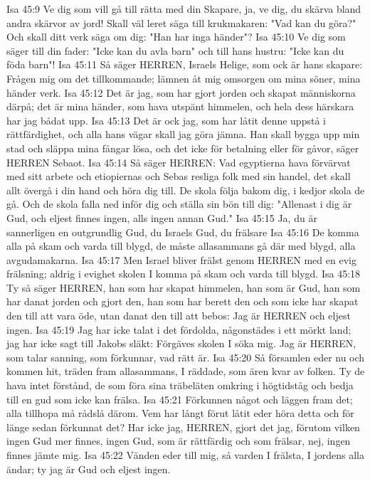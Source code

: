 Isa 45:9  Ve dig som vill gå till rätta med din Skapare, ja, ve dig, du skärva bland andra skärvor av jord! Skall väl leret säga till krukmakaren: "Vad kan du göra?" Och skall ditt verk säga om dig: "Han har inga händer"?
Isa 45:10  Ve dig som säger till din fader: "Icke kan du avla barn" och till hans hustru: "Icke kan du föda barn"!
Isa 45:11  Så säger HERREN, Israels Helige, som ock är hans skapare: Frågen mig om det tillkommande; lämnen åt mig omsorgen om mina söner, mina händer verk.
Isa 45:12  Det är jag, som har gjort jorden och skapat människorna därpå; det är mina händer, som hava utspänt himmelen, och hela dess härskara har jag bådat upp.
Isa 45:13  Det är ock jag, som har låtit denne uppstå i rättfärdighet, och alla hans vägar skall jag göra jämna. Han skall bygga upp min stad och släppa mina fångar lösa, och det icke för betalning eller för gåvor, säger HERREN Sebaot.
Isa 45:14  Så säger HERREN: Vad egyptierna hava förvärvat med sitt arbete och etiopiernas och Sebas resliga folk med sin handel, det skall allt övergå i din hand och höra dig till. De skola följa bakom dig, i kedjor skola de gå. Och de skola falla ned inför dig och ställa sin bön till dig: "Allenast i dig är Gud, och eljest finnes ingen, alls ingen annan Gud."
Isa 45:15  Ja, du är sannerligen en outgrundlig Gud, du Israels Gud, du frälsare
Isa 45:16  De komma alla på skam och varda till blygd, de måste allasammans gå där med blygd, alla avgudamakarna.
Isa 45:17  Men Israel bliver frälst genom HERREN med en evig frälsning; aldrig i evighet skolen I komma på skam och varda till blygd.
Isa 45:18  Ty så säger HERREN, han som har skapat himmelen, han som är Gud, han som har danat jorden och gjort den, han som har berett den och som icke har skapat den till att vara öde, utan danat den till att bebos: Jag är HERREN och eljest ingen.
Isa 45:19  Jag har icke talat i det fördolda, någonstädes i ett mörkt land; jag har icke sagt till Jakobs släkt: Förgäves skolen I söka mig. Jag är HERREN, som talar sanning, som förkunnar, vad rätt är.
Isa 45:20  Så församlen eder nu och kommen hit, träden fram allasammans, I räddade, som ären kvar av folken. Ty de hava intet förstånd, de som föra sina träbeläten omkring i högtidståg och bedja till en gud som icke kan frälsa.
Isa 45:21  Förkunnen något och läggen fram det; alla tillhopa må rådslå därom. Vem har långt förut låtit eder höra detta och för länge sedan förkunnat det? Har icke jag, HERREN, gjort det jag, förutom vilken ingen Gud mer finnes, ingen Gud, som är rättfärdig och som frälsar, nej, ingen finnes jämte mig.
Isa 45:22  Vänden eder till mig, så varden I frälsta, I jordens alla ändar; ty jag är Gud och eljest ingen.
